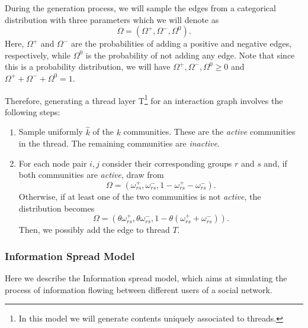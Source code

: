 During the generation process, we will sample the edges from a categorical
distribution with three parameters which we will denote as
\begin{equation*}
	\Omega = (\Omega^+, \Omega ^-, \Omega ^0).
\end{equation*}
Here, $\Omega ^+$ and $\Omega ^-$ are the probabilities of adding a positive and
negative edges, respectively, while $\Omega ^0$ is the probability of not
adding any edge. Note that since this is a probability distribution, we will
have $\Omega ^+, \Omega ^-, \Omega ^0 \geq 0$ and $\Omega ^+ + \Omega ^- +
	\Omega ^0 = 1$.

\bigskip

Therefore, generating a thread layer T\footnote{In this model we will generate
	contents uniquely associated to threads.} for an interaction graph
involves the following steps:
\begin{enumerate}
	\item Sample uniformly $\hat{k}$ of the $k$ communities. These are the
	      \emph{active} communities in the thread. The remaining communities
	      are \emph{inactive}.
	\item For each node pair $i, j$ consider their corresponding groups $r$ and
	      $s$ and, if both communities are \emph{active},
	      draw from
	      \begin{equation*}
		      \Omega = (\omega _{rs} ^{+}, \omega _{rs} ^{-}, 1 - \omega _{rs}
		      ^{+} - \omega _{rs} ^{-}).
	      \end{equation*}
	      Otherwise, if at least one of the
	      two communities is not \emph{active}, the distribution becomes
	      \begin{equation*}
		      \Omega = (\theta \omega _{rs} ^{+}, \theta \omega _{rs} ^{-}, 1 - \theta
		      (\omega _{rs} ^{+} + \omega _{rs} ^{-})).
	      \end{equation*}
	      Then, we possibly add the edge to thread $T$.

\end{enumerate}

\subsubsection{Information Spread Model}%
\label{ssub:information_spread_model}

Here we describe the Information spread model, which aims at simulating the
process of information flowing between different users of a social network.

